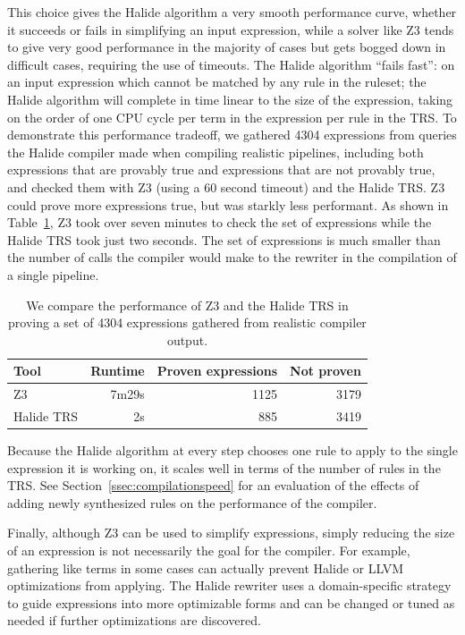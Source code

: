 \documentclass[acmsmall,review]{acmart}\settopmatter{printfolios=true,printccs=false,printacmref=false}
\begin{document}
This choice gives the Halide algorithm a very smooth performance curve, whether it succeeds or fails in simplifying an input expression, while a solver like Z3 tends to give very good performance in the majority of cases but gets bogged down in difficult cases, requiring the use of timeouts. The Halide algorithm ``fails fast'': on an input expression which cannot be matched by any rule in the ruleset; the Halide algorithm will complete in time linear to the size of the expression, taking on the order of one CPU cycle per term in the expression per rule in the TRS. To demonstrate this performance tradeoff, we gathered 4304 expressions from queries the Halide compiler made when compiling realistic pipelines, including both expressions that are provably true and expressions that are not provably true, and checked them with Z3 (using a 60 second timeout) and the Halide TRS. Z3 could prove more expressions true, but was starkly less performant. As shown in Table~\ref{tab:simplifiervsz3}, Z3 took over seven minutes to check the set of expressions while the Halide TRS took just two seconds. The set of expressions is much smaller than the number of calls the compiler would make to the rewriter in the compilation of a single pipeline.

\begin{table}
\caption{We compare the performance of Z3 and the Halide TRS in proving a set of 4304 expressions gathered from realistic compiler output.}
\begin{tabular}{l|r|r|r}
Tool & Runtime & Proven expressions & Not proven \\
\hline
Z3 & 7m29s & 1125 & 3179 \\
Halide TRS & 2s & 885 & 3419 
\end{tabular}
\label{tab:simplifiervsz3}
\end{table}

Because the Halide algorithm at every step chooses one rule to apply to the single expression it is working on, it scales well in terms of the number of rules in the TRS. See Section~\ref{ssec:compilationspeed} for an evaluation of the effects of adding newly synthesized rules on the performance of the compiler. 

Finally, although Z3 can be used to simplify expressions, simply reducing the size of an expression is not necessarily the goal for the compiler. For example, gathering like terms in some cases can actually prevent Halide or LLVM optimizations from applying. The Halide rewriter uses a domain-specific strategy to guide expressions into more optimizable forms and can be changed or tuned as needed if further optimizations are discovered. 
\end{document}
